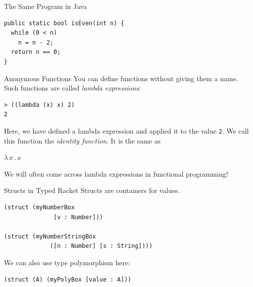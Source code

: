 \documentclass{beamer}
\begin{document}
\begin{frame}[fragile]{The Same Program in Java}
\begin{lstlisting}[style=Java]
public static bool isEven(int n) {
  while (0 < n)
    n = n - 2;
  return n == 0;
}
\end{lstlisting}
\end{frame}

\begin{frame}[fragile]{Anonymous Functions}
You can define functions without giving them a name. Such functions are called \textit{lambda expressions}:

\begin{lstlisting}
> ((lambda (x) x) 2)
2
\end{lstlisting}

\pause{}

Here, we have defined a lambda expression and applied it to the value \lstinline{2}. We call this function  the \textit{identity function}. It is the same as

\begin{center}
$\lambda\, x\, .\, x$
\end{center}

\pause{}

\vspace{.5cm}

We will often come across lambda expressions in functional programming!
\end{frame}

\begin{frame}[fragile]{Structs in Typed Racket}
Structs are containers for values.

\begin{lstlisting}
(struct (myNumberBox
              [v : Number]))

(struct (myNumberStringBox
             ([n : Number] [s : String])))
\end{lstlisting}

\pause{}

We can also use type polymorphism here:

\begin{lstlisting}
(struct (A) (myPolyBox [value : A]))
\end{lstlisting}
\end{frame}
\end{document}
